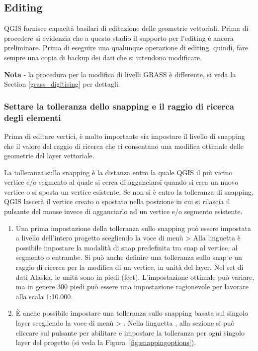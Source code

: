 \subsection{Editing}

QGIS fornisce capacità basilari di editazione delle geometrie vettoriali.
Prima di procedere si evidenzia che a questo stadio il supporto per l'editing
è ancora preliminare.
Prima di eseguire una qualunque operazione di editing, quindi, fare sempre una
copia di backup dei dati che si intendono modificare. 

\textbf{Nota} - la procedura per la modifica di livelli GRASS è differente, si
veda la Section \ref{grass_digitising} per dettagli.

\subsubsection{Settare la tolleranza dello snapping e il raggio di ricerca
degli elementi}

Prima di editare vertici, è molto importante sia impostare il livello di snapping
che il valore del raggio di ricerca che ci consentano una modifica ottimale delle
geometrie del layer vettoriale. 


La tolleranza sullo snapping è la distanza entro la quale QGIS
 il più vicino vertice e/o segmento al quale si cerca di
agganciarsi quando si crea un nuovo vertice o si sposta un vertice esistente.
Se non si è entro la tolleranza di snapping, QGIS lascerà il vertice creato o
spostato nella posizione in cui si rilascia il pulsante del mouse invece di
agganciarlo ad un vertice e/o segmento esistente. 

\begin{enumerate}
\item Una prima impostazione della tolleranza sullo snapping può essere
impostata a livello dell'intero progetto scegliendo la voce di menù  > 
Alla linguetta  è possibile impostare la modalità di
snap predefinita tra snap al vertice, al segmento o entrambe. Si può anche
definire una tolleranza sullo snap e un raggio di ricerca per la modifica di
un vertice, in unità del layer. Nel set di dati Alaska, le unità sono in piedi
(feet). L'impostazione ottimale può variare, ma in genere 300 piedi può essere
una impostazione ragionevole per lavorare alla scala 1:10.000.
\item È anche possibile impostare una tolleranza sullo snapping basata sul
singolo layer scegliendo la voce di menù  >
. Nella linguetta
, alla sezione  si può cliccare sul
pulsante  per abilitare e impostare la tolleranza
per ogni singolo layer del progetto (si veda la Figura~\ref{fig:snappingoptions}).
\end{enumerate}

